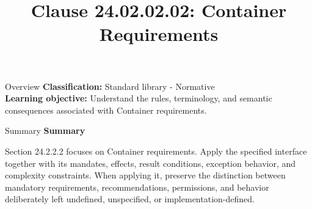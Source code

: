 \documentclass[10pt,letterpaper]{article}
\title{Clause 24.02.02.02: Container Requirements}
\author{}
\date{}
\begin{document}
\maketitle
\begin{CornellOverviewBox}{Overview}
\textbf{Classification:} Standard library - Normative\\[2pt]
\textbf{Learning objective:} Understand the rules, terminology, and semantic consequences associated with Container requirements.
\end{CornellOverviewBox}\begin{CornellSummaryBox}{Summary}
{\sffamily\bfseries\color{Accent} Summary}\par\vspace{3pt}Section 24.2.2.2 focuses on Container requirements. Apply the specified interface together with its mandates, effects, result conditions, exception behavior, and complexity constraints. When applying it, preserve the distinction between mandatory requirements, recommendations, permissions, and behavior deliberately left undefined, unspecified, or implementation-defined.
\end{CornellSummaryBox}
\end{document}
